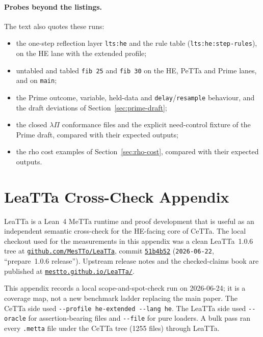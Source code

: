 \documentclass[11pt]{article}
\newcommand{\code}[1]{\texttt{#1}}
\newcommand{\PeTTa}{\textup{PeTTa}}
\newcommand{\HE}{\textup{HE}}
\newcommand{\CeTTa}{\textup{CeTTa}}
\newcommand{\LeaTTa}{\textup{LeaTTa}}
\begin{document}
\paragraph{Probes beyond the listings.}  The text also quotes these runs:
\begin{itemize}
\item the one-step reflection layer \code{lts:he} and the rule table
  (\code{lts:he:step-rules}), on the \HE{} lane with the extended profile;
\item untabled and tabled \code{fib 25} and \code{fib 30} on the \HE{},
  \PeTTa{} and Prime lanes, and on \code{main};
\item the Prime outcome, variable, held-data and \code{delay}/\code{resample}
  behaviour, and the draft deviations of Section~\ref{sec:prime-draft};
\item the closed $\lambda\Pi$ conformance files and the explicit
  need-control fixture of the Prime draft, compared with their expected
  outputs;
\item the rho cost examples of Section~\ref{sec:rho-cost}, compared with their
  expected outputs.
\end{itemize}

\appendix

\section{\LeaTTa{} Cross-Check Appendix}
\label{app:leatta}

\LeaTTa{} is a Lean~4 MeTTa runtime and proof development that is useful
as an independent semantic cross-check for the \HE{}-facing core of
\CeTTa{}.  The local checkout used for the measurements in this
appendix was a clean \LeaTTa{}~1.0.6 tree at
\href{https://github.com/MesTTo/LeaTTa}{\code{github.com/MesTTo/LeaTTa}},
commit
\href{https://github.com/MesTTo/LeaTTa/tree/51b4b52bd02745992448835f5173989baf1436b5}{\code{51b4b52}}
(\code{2026-06-22}, ``prepare~1.0.6 release'').  Upstream release
notes and the checked-claims book are published at
\href{https://mestto.github.io/LeaTTa/}{\code{mestto.github.io/LeaTTa/}}.

This appendix records a local scope-and-spot-check run on 2026-06-24; it
is a coverage map, not a new benchmark ladder replacing the main paper.
The \CeTTa{} side used \code{-{}-profile he-extended -{}-lang he}.  The
\LeaTTa{} side used \code{-{}-oracle} for assertion-bearing files and
\code{-{}-file} for pure loaders.  A bulk pass ran every \code{.metta}
file under the \CeTTa{} tree (1255 files) through \LeaTTa{}.
\end{document}
